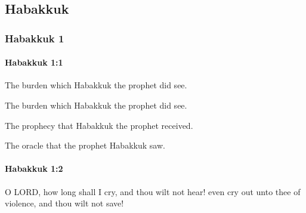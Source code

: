\subsection{Habakkuk}
	\label{HABAKKUK}

	\subsubsection{Habakkuk 1} %
		\label{HABAKKUK-1}

		\paragraph{Habakkuk 1:1} %
			\label{HABAKKUK-1-1}

			The burden which Habakkuk the prophet did see.

			\begin{versebox}
					\item[BHS] 
					\item[LXX] 
					\item[ASV] The burden which Habakkuk the prophet did see.
					\item[NIV] The prophecy that Habakkuk the prophet received.
					\item[NRSV] The oracle that the prophet Habakkuk saw.
			\end{versebox}

		\paragraph{Habakkuk 1:2} %
			\label{HABAKKUK-1-2}

			O LORD, how long shall I cry, and thou wilt not hear! even cry out unto thee of violence, and thou wilt not save!

